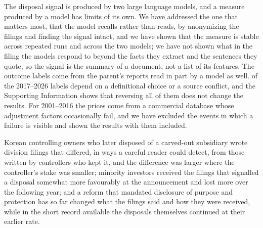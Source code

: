 The disposal signal is produced by two large language models, and a measure produced by a model has limits of its own. We have addressed the one that matters most, that the model recalls rather than reads, by anonymizing the filings and finding the signal intact, and we have shown that the measure is stable across repeated runs and across the two models; we have not shown what in the filing the models respond to beyond the facts they extract and the sentences they quote, so the signal is the summary of a document, not a list of its features. The outcome labels come from the parent's reports read in part by a model as well. \NSensitive{} of the 2017--2026 labels depend on a definitional choice or a source conflict, and the Supporting Information shows that reversing all of them does not change the results. For 2001--2016 the prices come from a commercial database whose adjustment factors occasionally fail, and we have excluded the \GlitchExcluded{} events in which a failure is visible and shown the results with them included.

Korean controlling owners who later disposed of a carved-out subsidiary wrote division filings that differed, in ways a careful reader could detect, from those written by controllers who kept it, and the difference was larger where the controller's stake was smaller; minority investors received the filings that signalled a disposal somewhat more favourably at the announcement and lost more over the following year; and a reform that mandated disclosure of purpose and protection has so far changed what the filings said and how they were received, while in the short record available the disposals themselves continued at their earlier rate.
